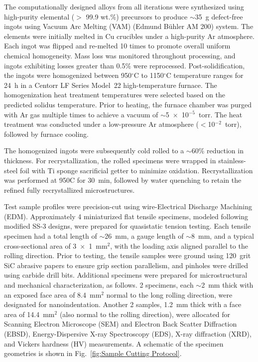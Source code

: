 The computationally designed alloys from all iterations were synthesized using high-purity elemental ($>$ 99.9 wt.\%) precursors to produce $\sim$35~g defect-free ingots using Vacuum Arc Melting (VAM) (Edmund B\"{u}hler AM 200) system. The elements were initially melted in Cu crucibles under a high-purity Ar atmosphere. Each ingot was flipped and re-melted 10 times to promote overall uniform chemical homogeneity. Mass loss was monitored throughout processing, and ingots exhibiting losses greater than 0.5\% were reprocessed. Post-solidification, the ingots were homogenized between 950$^\circ$C to 1150$^\circ$C temperature ranges for 24~h in a Centorr LF Series Model~22 high-temperature furnace. The homogenization heat treatment temperatures were selected based on the predicted solidus temperature. Prior to heating, the furnace chamber was purged with Ar gas multiple times to achieve a vacuum of $\sim$5~$\times$~10$^{-5}$~torr. The heat treatment was conducted under a low-pressure Ar atmosphere ($<$10$^{-2}$~torr), followed by furnace cooling.

The homogenized ingots were subsequently cold rolled to a $\sim$60\% reduction in thickness. For recrystallization, the rolled specimens were wrapped in stainless-steel foil with Ti sponge sacrificial getter to minimize oxidation. Recrystallization was performed at 950\textdegree C for 30~min, followed by water quenching to retain the refined fully recrystallized microstructures.

Test sample profiles were precision-cut using wire-Electrical Discharge Machining (EDM). Approximately 4 miniaturized flat tensile specimens, modeled following modified SS-3 designs, were prepared for quasistatic tension testing. Each tensile specimen had a total length of $\sim$26~mm, a gauge length of $\sim$8~mm, and a typical cross-sectional area of 3~$\times$~1~mm$^{2}$, with the loading axis aligned parallel to the rolling direction. Prior to testing, the tensile samples were ground using 120~grit SiC abrasive papers to ensure grip section parallelism, and pinholes were drilled using carbide drill bits. Additional specimens were prepared for microstructural and mechanical characterization, as follows. 2 specimens, each $\sim$2~mm thick with an exposed face area of 8.4~mm$^{2}$ normal to the long rolling direction, were designated for nanoindentation. Another 2 samples, 1.2~mm thick with a face area of 14.4~mm$^{2}$ (also normal to the rolling direction), were allocated for Scanning Electron Microscope (SEM) and Electron Back Scatter Diffraction (EBSD), Energy-Dispersive X-ray Spectroscopy (EDS), X-ray diffraction (XRD), and Vickers hardness (HV) measurements. A schematic of the specimen geometries is shown in Fig.~\ref{fig:Sample Cutting Protocol}.


